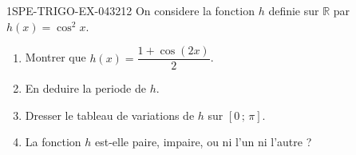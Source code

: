 \begin{exercice}{1SPE-TRIGO-EX-043}{2}{12}
On considere la fonction $h$ definie sur $\mathbb{R}$ par $h(x) = \cos^2 x$.
\begin{enumerate}
  \item Montrer que $h(x) = \dfrac{1 + \cos(2x)}{2}$.
  \item En deduire la periode de $h$.
  \item Dresser le tableau de variations de $h$ sur $[0\,;\,\pi]$.
  \item La fonction $h$ est-elle paire, impaire, ou ni l'un ni l'autre ?
\end{enumerate}
\end{exercice}
